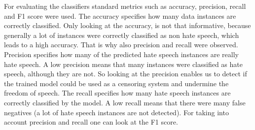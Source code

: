For evaluating the classifiers standard metrics such as accuracy, precision, recall and F1 score were used. The accuracy specifies how many data instances are correctly classified. Only looking at the accuracy, is not that informative, because generally a lot of instances were correctly classified as non hate speech, which leads to a high accuracy. That is why also precision and recall were observed. Precision specifies how many of the predicted hate speech instances are really hate speech. A low precision means that many instances were classified as hate speech, although they are not. So looking at the precision enables us to detect if the trained model could be used as a censoring system and undermine the freedom of speech. The recall specifies how many hate speech instances are correctly classified by the model. A low recall means that there were many false negatives (a lot of hate speech instances are not detected). For taking into account precision and recall one can look at the F1 score.

